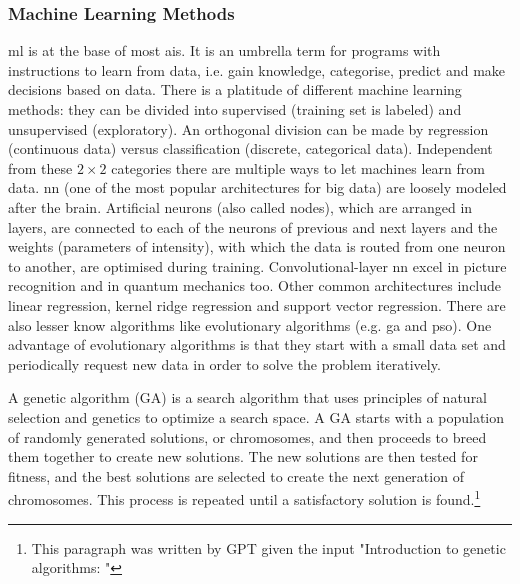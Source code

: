 \subsubsection{Machine Learning Methods}
%
\Gls{ml} is at the base of most \gls{ai}s.
It is an umbrella term for programs with instructions to learn from data, i.e. gain knowledge, categorise, predict and make decisions based on data. 
%
There is a platitude of different machine learning methods: 
they can be divided into supervised (training set is labeled) and unsupervised (exploratory).  
An orthogonal division can be made by regression (continuous data) versus classification (discrete, categorical data). 
Independent from these $2\times2$ categories there are multiple ways to let machines learn from data.
%
\Gls{nn} (one of the most popular architectures for big data\cite{Chiroma2019}) are loosely modeled after the brain\cite{bishop1994neural}.
Artificial neurons (also called nodes), which are arranged in layers, 
are connected to each of the neurons of previous and next layers
and the weights (parameters of intensity), with which the data is routed from one neuron to another, 
are optimised during training. 
%
Convolutional-layer \gls{nn} excel in picture recognition\cite{Lecun1995conv} and in quantum mechanics too\cite{westermayr2020combining}.
Other common architectures include linear regression, kernel ridge regression and support vector regression.
There are also lesser know algorithms like 
evolutionary algorithms (e.g. \gls{ga} and \gls{pso}).
%
One advantage of evolutionary algorithms is that they start with a small data set
and periodically request new data in order to solve the problem iteratively.

A genetic algorithm (GA) is a search algorithm that uses principles of natural selection and genetics to optimize a search space. A GA starts with a population of randomly generated solutions, or chromosomes, and then proceeds to breed them together to create new solutions. The new solutions are then tested for fitness, and the best solutions are selected to create the next generation of chromosomes. This process is repeated until a satisfactory solution is found.\footnote{This paragraph was written by GPT\cite{Liu2021gpt} given the input "Introduction to genetic algorithms: "}

